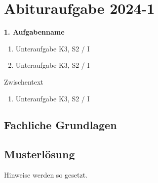 \chapter{Abituraufgabe 2024-1}\label{Denk}

\begin{aufgabe}
	\textbf{1. Aufgabenname}
	\begin{enumerate}
		\item Unteraufgabe \hfill K3, S2 / I
		\item Unteraufgabe \hfill K3, S2 / I
	\end{enumerate}
	Zwischentext
	\begin{enumerate}[resume]
		\item Unteraufgabe \hfill K3, S2 / I
	\end{enumerate}
\end{aufgabe}


\section{Fachliche Grundlagen}

\section{Musterlösung}

\begin{hinweis}
	Hinweise werden so gesetzt.
\end{hinweis}